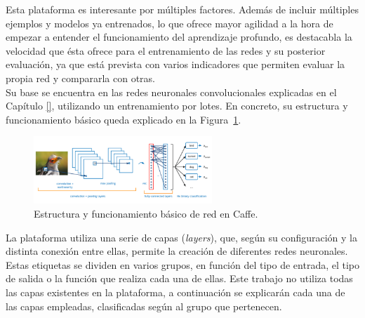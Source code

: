 Esta plataforma es interesante por múltiples factores. Además de incluir múltiples ejemplos y modelos ya entrenados, lo que ofrece mayor agilidad a la hora de empezar a entender el funcionamiento del aprendizaje profundo, es destacabla la velocidad que ésta ofrece para el entrenamiento de las redes y su posterior evaluación, ya que está prevista con varios indicadores que permiten evaluar la propia red y compararla con otras.\\ 

Su base se encuentra en las redes neuronales convolucionales explicadas en el Capítulo \ref{}, utilizando un entrenamiento por lotes. En concreto, su estructura y funcionamiento básico queda explicado en la Figura~\ref{fig.redCaffe}.\\

\begin{figure}[H]
	\begin{center}
		\includegraphics[width=0.6\textwidth]{figures/red_caffe}
		\caption{Estructura y funcionamiento básico de red en Caffe.}
		\label{fig.redCaffe}
	\end{center}
\end{figure}

La plataforma utiliza una serie de capas (\textit{layers}), que, según su configuración y la distinta conexión entre ellas, permite la creación de diferentes redes neuronales. Estas etiquetas se dividen en varios grupos, en función del tipo de entrada, el tipo de salida o la función que realiza cada una de ellas. Este trabajo no utiliza todas las capas existentes en la plataforma, a continuación se explicarán cada una de las capas empleadas, clasificadas según al grupo que pertenecen.\\

